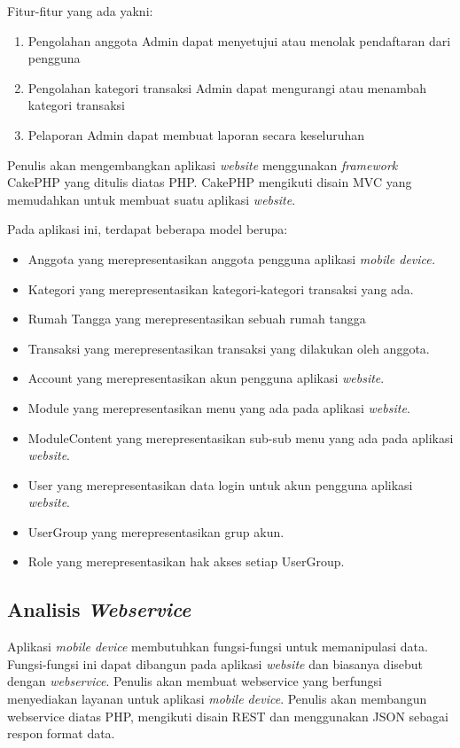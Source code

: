 Fitur-fitur yang ada yakni:
\begin{enumerate}
	\item Pengolahan anggota
				Admin dapat menyetujui atau menolak pendaftaran dari pengguna
	\item	Pengolahan kategori transaksi
				Admin dapat mengurangi atau menambah kategori transaksi
	\item Pelaporan
				Admin dapat membuat laporan secara keseluruhan
\end{enumerate}

Penulis akan mengembangkan aplikasi \textit{website} menggunakan \textit{framework} CakePHP yang ditulis diatas PHP. CakePHP mengikuti disain MVC yang memudahkan untuk membuat suatu aplikasi \textit{website}.

Pada aplikasi ini, terdapat beberapa model berupa:
\begin{itemize}
	\item Anggota yang merepresentasikan anggota pengguna aplikasi \textit{mobile device.}
	\item Kategori yang merepresentasikan kategori-kategori transaksi yang ada.
	\item Rumah Tangga yang merepresentasikan sebuah rumah tangga
	\item Transaksi yang merepresentasikan transaksi yang dilakukan oleh anggota.
	\item Account yang merepresentasikan akun pengguna aplikasi \textit{website}.
	\item Module yang merepresentasikan menu yang ada pada aplikasi \textit{website}.
	\item ModuleContent yang merepresentasikan sub-sub menu yang ada pada aplikasi \textit{website}.
	\item User yang merepresentasikan data login untuk akun pengguna aplikasi \textit{website}.
	\item UserGroup yang merepresentasikan grup akun.
	\item Role yang merepresentasikan hak akses setiap UserGroup.
\end{itemize}

\subsection{Analisis \textit{Webservice}}

\hspace{0,5cm}Aplikasi \textit{mobile device} membutuhkan fungsi-fungsi untuk memanipulasi data. Fungsi-fungsi ini dapat dibangun pada aplikasi \textit{website} dan biasanya disebut dengan \textit{webservice}. Penulis akan membuat webservice yang berfungsi menyediakan layanan untuk aplikasi \textit{mobile device}. Penulis akan membangun webservice diatas PHP, mengikuti disain REST dan menggunakan JSON sebagai respon format data.

